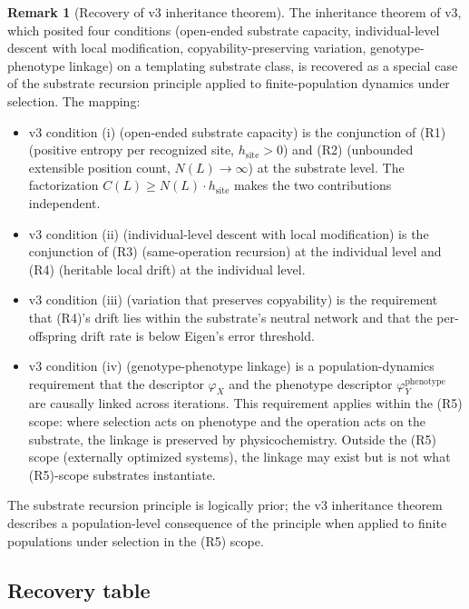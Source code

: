\documentclass[11pt]{article}
\theoremstyle{plain}
\theoremstyle{definition}
\newtheorem{remark}[theorem]{Remark}
\newcommand{\descX}{\varphi_X}
\newcommand{\descY}{\varphi_Y}
\begin{document}
\begin{remark}[Recovery of v3 inheritance theorem]
The inheritance theorem of v3, which posited four conditions (open-ended substrate capacity, individual-level descent with local modification, copyability-preserving variation, genotype-phenotype linkage) on a templating substrate class, is recovered as a special case of the substrate recursion principle applied to finite-population dynamics under selection. The mapping:
\begin{itemize}
  \item v3 condition (i) (open-ended substrate capacity) is the conjunction of (R1) (positive entropy per recognized site, $h_{\mathrm{site}} > 0$) and (R2) (unbounded extensible position count, $N(L) \to \infty$) at the substrate level. The factorization $C(L) \ge N(L) \cdot h_{\mathrm{site}}$ makes the two contributions independent.
  \item v3 condition (ii) (individual-level descent with local modification) is the conjunction of (R3) (same-operation recursion) at the individual level and (R4) (heritable local drift) at the individual level.
  \item v3 condition (iii) (variation that preserves copyability) is the requirement that (R4)'s drift lies within the substrate's neutral network and that the per-offspring drift rate is below Eigen's error threshold.
  \item v3 condition (iv) (genotype-phenotype linkage) is a population-dynamics requirement that the descriptor $\descX$ and the phenotype descriptor $\descY^{\mathrm{phenotype}}$ are causally linked across iterations. This requirement applies within the (R5) scope: where selection acts on phenotype and the operation acts on the substrate, the linkage is preserved by physicochemistry. Outside the (R5) scope (externally optimized systems), the linkage may exist but is not what (R5)-scope substrates instantiate.
\end{itemize}
The substrate recursion principle is logically prior; the v3 inheritance theorem describes a population-level consequence of the principle when applied to finite populations under selection in the (R5) scope.
\end{remark}

\subsection{Recovery table}
\end{document}
